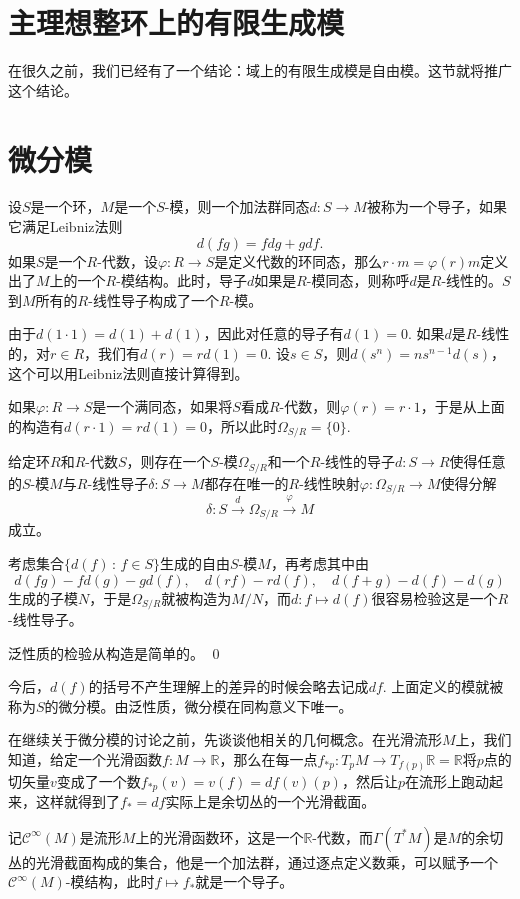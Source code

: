 \section{主理想整环上的有限生成模}

\para 在很久之前，我们已经有了一个结论：域上的有限生成模是自由模。这节就将推广这个结论。

\section{微分模}

\para 设$S$是一个环，$M$是一个$S$-模，则一个加法群同态$d:S\to M$被称为一个导子，如果它满足Leibniz法则
\[
	d(fg)=fdg+gdf.
\]
如果$S$是一个$R$-代数，设$\varphi:R\to S$是定义代数的环同态，那么$r\cdot m=\varphi(r)m$定义出了$M$上的一个$R$-模结构。此时，导子$d$如果是$R$-模同态，则称呼$d$是$R$-线性的。$S$到$M$所有的$R$-线性导子构成了一个$R$-模。

由于$d(1\cdot 1)=d(1)+d(1)$，因此对任意的导子有$d(1)=0$. 如果$d$是$R$-线性的，对$r\in R$，我们有$d(r)=rd(1)=0$. 设$s\in S$，则$d(s^n)=ns^{n-1}d(s)$，这个可以用Leibniz法则直接计算得到。

如果$\varphi:R\to S$是一个满同态，如果将$S$看成$R$-代数，则$\varphi(r)=r\cdot 1$，于是从上面的构造有$d(r\cdot 1)=rd(1)=0$，所以此时$\Omega_{S/R}=\{0\}$.

\pro 给定环$R$和$R$-代数$S$，则存在一个$S$-模$\Omega_{S/R}$和一个$R$-线性的导子$d:S\to R$使得任意的$S$-模$M$与$R$-线性导子$\delta: S\to M$都存在唯一的$R$-线性映射$\varphi:\Omega_{S/R}\to M$使得分解
\[
	\delta:S\xrightarrow{d}\Omega_{S/R}\xrightarrow{\varphi}M
\]
成立。

\proof
	考虑集合$\{d(f)\,:\, f\in S\}$生成的自由$S$-模$M$，再考虑其中由
	\[
	d(fg)-fd(g)-gd(f),\quad d(rf)-rd(f),\quad d(f+g)-d(f)-d(g)
	\]
	生成的子模$N$，于是$\Omega_{S/R}$就被构造为$M/N$，而$d:f\mapsto d(f)$很容易检验这是一个$R$-线性导子。

	泛性质的检验从构造是简单的。
\qed

今后，$d(f)$的括号不产生理解上的差异的时候会略去记成$df$. 上面定义的模就被称为$S$的微分模。由泛性质，微分模在同构意义下唯一。

\para 在继续关于微分模的讨论之前，先谈谈他相关的几何概念。在光滑流形$M$上，我们知道，给定一个光滑函数$f:M\to \mathbb{R}$，那么在每一点$f_{*p}:T_pM\to T_{f(p)}\mathbb{R}=\mathbb{R}$将$p$点的切矢量$v$变成了一个数$f_{*p}(v)=v(f)=df(v)(p)$，然后让$p$在流形上跑动起来，这样就得到了$f_*=df$实际上是余切丛的一个光滑截面。

记$\mathcal{C}^\infty(M)$是流形$M$上的光滑函数环，这是一个$\mathbb{R}$-代数，而$\Gamma(T^*M)$是$M$的余切丛的光滑截面构成的集合，他是一个加法群，通过逐点定义数乘，可以赋予一个$\mathcal{C}^\infty(M)$-模结构，此时$f\mapsto f_*$就是一个导子。


